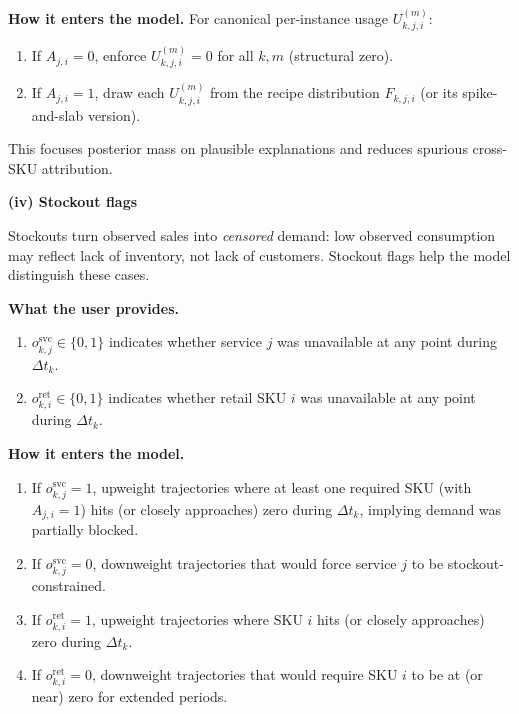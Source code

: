 \documentclass[11pt]{article}
\begin{document}
\textbf{How it enters the model.} For canonical per-instance usage $U^{(m)}_{k,j,i}$:
\begin{enumerate}
  \item If $A_{j,i}=0$, enforce $U^{(m)}_{k,j,i}=0$ for all $k,m$ (structural zero).
  \item If $A_{j,i}=1$, draw each $U^{(m)}_{k,j,i}$ from the recipe distribution $F_{k,j,i}$ (or its spike-and-slab version).
\end{enumerate}

This focuses posterior mass on plausible explanations and reduces spurious cross-SKU attribution.

\textbf{(iv) Stockout flags}

Stockouts turn observed sales into \emph{censored} demand: low observed consumption may reflect lack of inventory, not lack of customers.
Stockout flags help the model distinguish these cases.

\textbf{What the user provides.}
\begin{enumerate}
  \item $o^{\mathrm{svc}}_{k,j}\in\{0,1\}$ indicates whether service $j$ was unavailable at any point during $\Delta t_k$.
  \item $o^{\mathrm{ret}}_{k,i}\in\{0,1\}$ indicates whether retail SKU $i$ was unavailable at any point during $\Delta t_k$.
\end{enumerate}

\textbf{How it enters the model.}
\begin{enumerate}
  \item If $o^{\mathrm{svc}}_{k,j}=1$, upweight trajectories where at least one required SKU (with $A_{j,i}=1$) hits (or closely approaches) zero during $\Delta t_k$, implying demand was partially blocked.
  \item If $o^{\mathrm{svc}}_{k,j}=0$, downweight trajectories that would force service $j$ to be stockout-constrained.

  \item If $o^{\mathrm{ret}}_{k,i}=1$, upweight trajectories where SKU $i$ hits (or closely approaches) zero during $\Delta t_k$.
  \item If $o^{\mathrm{ret}}_{k,i}=0$, downweight trajectories that would require SKU $i$ to be at (or near) zero for extended periods.
\end{enumerate}
\end{document}
